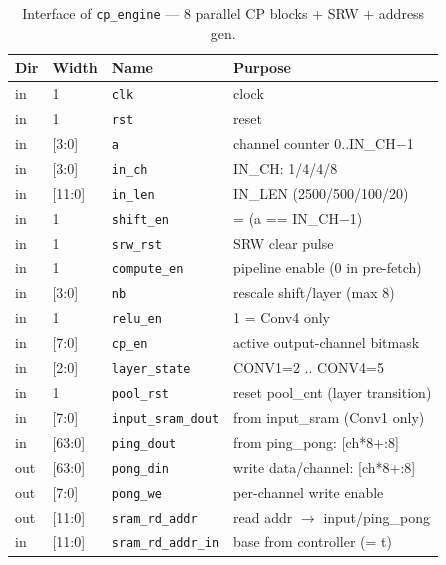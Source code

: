 \begin{table}[t]
\centering
\caption{Interface of \texttt{cp\_engine} — 8 parallel CP blocks + SRW + address gen.}
\label{tab:if-cp-engine}
\small
\setlength{\tabcolsep}{4pt}
\renewcommand{\arraystretch}{1.1}
\begin{tabular}{@{}llll@{}}
\toprule
\textbf{Dir} & \textbf{Width} & \textbf{Name} & \textbf{Purpose} \\
\midrule
in  & 1      & \texttt{clk}              & clock \\
in  & 1      & \texttt{rst}              & reset \\
in  & [3:0]  & \texttt{a}                & channel counter 0..IN\_CH$-$1 \\
in  & [3:0]  & \texttt{in\_ch}           & IN\_CH: 1/4/4/8 \\
in  & [11:0] & \texttt{in\_len}          & IN\_LEN (2500/500/100/20) \\
in  & 1      & \texttt{shift\_en}        & = (a == IN\_CH$-$1) \\
in  & 1      & \texttt{srw\_rst}         & SRW clear pulse \\
in  & 1      & \texttt{compute\_en}      & pipeline enable (0 in pre-fetch) \\
in  & [3:0]  & \texttt{nb}               & rescale shift/layer (max 8) \\
in  & 1      & \texttt{relu\_en}         & 1 = Conv4 only \\
in  & [7:0]  & \texttt{cp\_en}           & active output-channel bitmask \\
in  & [2:0]  & \texttt{layer\_state}     & CONV1=2 .. CONV4=5 \\
in  & 1      & \texttt{pool\_rst}        & reset pool\_cnt (layer transition) \\
in  & [7:0]  & \texttt{input\_sram\_dout}& from input\_sram (Conv1 only) \\
in  & [63:0] & \texttt{ping\_dout}       & from ping\_pong: [ch*8+:8] \\
out & [63:0] & \texttt{pong\_din}        & write data/channel: [ch*8+:8] \\
out & [7:0]  & \texttt{pong\_we}         & per-channel write enable \\
out & [11:0] & \texttt{sram\_rd\_addr}   & read addr $\to$ input/ping\_pong \\
in  & [11:0] & \texttt{sram\_rd\_addr\_in}& base from controller (= t) \\
\bottomrule
\end{tabular}
\end{table}

